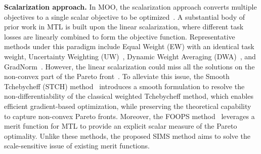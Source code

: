\documentclass[sigconf]{acmart}
\begin{document}
\vspace{0.5\baselineskip}
\noindent \textbf{Scalarization approach.}
In MOO, the scalarization approach converts multiple objectives to a single scalar objective to be optimized~\cite{marler2004survey}. 
A substantial body of prior work in MTL is built upon the linear scalarization, where different task losses are linearly combined to form the objective function. %
Representative methods under this paradigm include Equal Weight (EW) with an identical task weight, Uncertainty Weighting (UW)~\cite{kendall2018multi}, Dynamic Weight Averaging (DWA)~\cite{liu2019end}, and GradNorm~\cite{chen2018gradnorm}. 
However, the linear scalarization could miss all the solutions on the non-convex part of the Pareto front~\cite{das1997closer}. 
To alleviate this issue, the Smooth Tchebycheff (STCH) method~\cite{lin2024smooth} introduces a smooth formulation to resolve the non-differentiability of the classical weighted Tchebycheff method, which enables efficient gradient-based optimization, while preserving the theoretical capability to capture non-convex Pareto fronts. Moreover, the FOOPS method~\cite{chen2025efficient} leverages a merit function for MTL to provide an explicit scalar measure of the Pareto optimality. %
Unlike these methods, the proposed SIMS method aims to solve the scale-sensitive issue of existing merit functions.%
\end{document}

